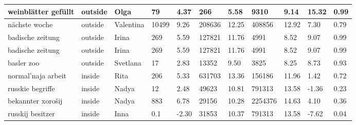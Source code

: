\begin{longtable}{|p{3cm}|p{1cm}|p{1cm}|R{0.8cm}|R{0.8cm}|R{1.2cm}|R{1cm}|R{1.3cm}|R{1cm}|R{0.8cm}|R{0.6cm}|}
weinbl\"{a}tter gef\"{u}llt                                    & outside     & Olga      & 79                  & 4.37                      & 266        & 5.58             & 9310         & 9.14                  & 15.32 & 0.99                 \\ \hline
n\"{a}chste woche                                                  & outside     & Valentina & 10499               & 9.26                      & 208636     & 12.25            & 408856       & 12.92                 & 7.30  & 0.79                 \\ \hline
badische zeitung                                                   & outside     & Irina     & 269                 & 5.59                      & 127821     & 11.76            & 4991         & 8.52                  & 9.07  & 0.99                 \\ \hline
badische zeitung                                                   & outside     & Irina     & 269                 & 5.59                      & 127821     & 11.76            & 4991         & 8.52                  & 9.07  & 0.99                 \\ \hline
basler zoo                                                         & outside     & Svetlana  & 17                  & 2.83                      & 13352      & 9.50             & 3825         & 8.25                  & 8.73  & 0.93                 \\ \hline
normal'naja arbeit                                                 & inside      & Rita      & 206                 & 5.33                      & 631703     & 13.36            & 156186       & 11.96                 & 1.42  & 0.72                 \\ \hline
russkie begriffe                                                   & inside      & Nadya     & 12                  & 2.48                      & 49623      & 10.81            & 791313       & 13.58                 & -1.36 & 0.23                 \\ \hline
bekannter xoro\v{s}ij                                              & inside      & Nadya     & 883                 & 6.78                      & 29156      & 10.28            & 2254376      & 14.63                 & 4.10  & 0.36                 \\ \hline
russkij besitzer                                                   & inside      & Inna      & 0.1                 & -2.30                     & 31853      & 10.37            & 791313       & 13.58                 & -7.62 & 0.04                 \\ \hline

\end{longtable}
